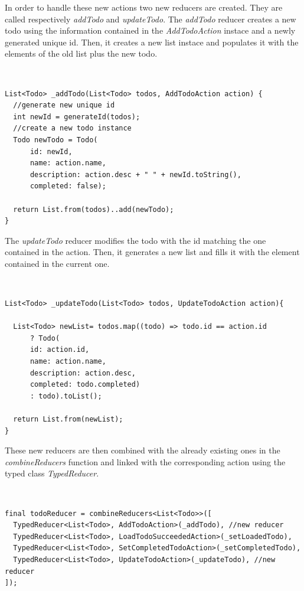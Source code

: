 In order to handle these new actions two new reducers are  created. They are called respectively \textit{addTodo} and \textit{updateTodo}. The \textit{addTodo} reducer  creates a new todo using the information contained in the \textit{AddTodoAction}  instace and a newly generated unique id. Then, it creates a new list instace and populates it with the elements of the old list plus the new todo.
\begin{code}
\mbox{}\\
 \mbox{}
		\label{code:2.14}
\begin{verbatim}
List<Todo> _addTodo(List<Todo> todos, AddTodoAction action) {
  //generate new unique id
  int newId = generateId(todos);
  //create a new todo instance
  Todo newTodo = Todo(
      id: newId,
      name: action.name,
      description: action.desc + " " + newId.toString(),
      completed: false);

  return List.from(todos)..add(newTodo);
}
\end{verbatim}
\mbox{}
\end{code}

The \textit{updateTodo} reducer modifies the todo with the id matching the one contained in the action. Then, it generates a new list and fills it with the element contained in the current one.
\begin{code}
\mbox{}\\
 \mbox{}
		\label{code:2.14}
\begin{verbatim}
List<Todo> _updateTodo(List<Todo> todos, UpdateTodoAction action){

  List<Todo> newList= todos.map((todo) => todo.id == action.id
      ? Todo(
      id: action.id,
      name: action.name,
      description: action.desc,
      completed: todo.completed)
      : todo).toList();

  return List.from(newList);
}
\end{verbatim}
\mbox{}
\end{code}

These new reducers are then combined with the already existing ones in the \textit{combineReducers} function and linked with the corresponding action using the typed class \textit{TypedReducer}.
\begin{code}
\mbox{}\\
 \mbox{}
		\label{code:2.14}
\begin{verbatim}
final todoReducer = combineReducers<List<Todo>>([
  TypedReducer<List<Todo>, AddTodoAction>(_addTodo), //new reducer
  TypedReducer<List<Todo>, LoadTodoSucceededAction>(_setLoadedTodo),
  TypedReducer<List<Todo>, SetCompletedTodoAction>(_setCompletedTodo),
  TypedReducer<List<Todo>, UpdateTodoAction>(_updateTodo), //new reducer
]);
\end{verbatim}
\mbox{}
\end{code}

